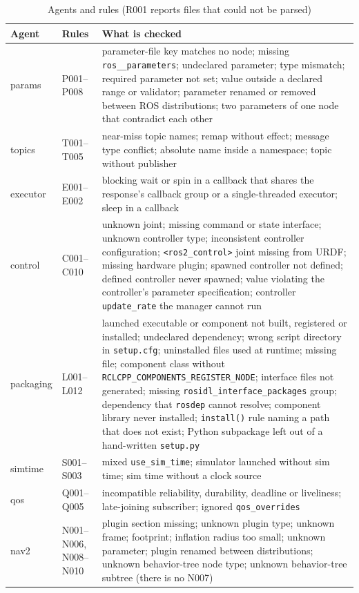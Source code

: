 \documentclass[conference]{IEEEtran}
\newcommand{\code}[1]{\texttt{#1}}
\begin{document}
\begin{table}[t]
\centering
\caption{Agents and rules (R001 reports files that could not be parsed)}
\label{tab:rules}
\footnotesize
\begin{tabularx}{\textwidth}{@{}l l X@{}}
\toprule
Agent & Rules & What is checked\\
\midrule
params    & P001--P008 & parameter-file key matches no node; missing \code{ros\_\_parameters}; undeclared parameter; type mismatch; required parameter not set; value outside a declared range or validator; parameter renamed or removed between ROS distributions; two parameters of one node that contradict each other\\
topics    & T001--T005 & near-miss topic names; remap without effect; message type conflict; absolute name inside a namespace; topic without publisher\\
executor  & E001--E002 & blocking wait or spin in a callback that shares the response's callback group or a single-threaded executor; sleep in a callback\\
control   & C001--C010 & unknown joint; missing command or state interface; unknown controller type; inconsistent controller configuration; \code{<ros2\_control>} joint missing from URDF; missing hardware plugin; spawned controller not defined; defined controller never spawned; value violating the controller's parameter specification; controller \code{update\_rate} the manager cannot run\\
packaging & L001--L012 & launched executable or component not built, registered or installed; undeclared dependency; wrong script directory in \code{setup.cfg}; uninstalled files used at runtime; missing file; component class without \code{RCLCPP\_COMPONENTS\_REGISTER\_NODE}; interface files not generated; missing \code{rosidl\_interface\_packages} group; dependency that \code{rosdep} cannot resolve; component library never installed; \code{install()} rule naming a path that does not exist; Python subpackage left out of a hand-written \code{setup.py}\\
simtime   & S001--S003 & mixed \code{use\_sim\_time}; simulator launched without sim time; sim time without a clock source\\
qos       & Q001--Q005 & incompatible reliability, durability, deadline or liveliness; late-joining subscriber; ignored \code{qos\_overrides}\\
nav2      & N001--N006, N008--N010 & plugin section missing; unknown plugin type; unknown frame; footprint; inflation radius too small; unknown parameter; plugin renamed between distributions; unknown behavior-tree node type; unknown behavior-tree subtree (there is no N007)\\

\end{tabularx}
\end{table}
\end{document}
